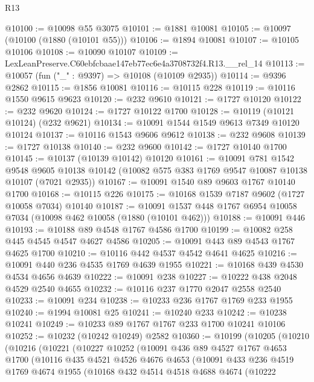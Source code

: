 \begin{lexlean}{R13}
\begin{coremodule}
@10100 := @10098 @55 @3075
@10101 := @1881 @10081
@10105 := @10097 (@10100 (@1880 (@10101 @55)))
@10106 := @1894 @10081
@10107 := @10105 @10106
@10108 := @10090 @10107
@10109 := LexLeanPreserve.C60ebfcbaae147eb77ec6e4a3708732f4.R13.__rel_14
@10113 := @10057 (fun ("_" : @9397) => @10108 (@10109 @2935))
@10114 := @9396 @2862
@10115 := @1856 @10081
@10116 := @10115 @228
@10119 := @10116 @1550 @9615 @9623
@10120 := @232 @9610
@10121 := @1727 @10120
@10122 := @232 @9620
@10124 := @1727 @10122 @1700
@10128 := @10119 (@10121 @10124) (@232 @9621)
@10134 := @10091 @1544 @1549 @9613 @7349 @10120 @10124
@10137 := @10116 @1543 @9606 @9612
@10138 := @232 @9608
@10139 := @1727 @10138
@10140 := @232 @9600
@10142 := @1727 @10140 @1700
@10145 := @10137 (@10139 @10142) @10120
@10161 := @10091
    @781
    @1542
    @9548
    @9605
    @10138
    @10142
    (@10082 @575 @383 @1769 @9547 @10087 @10138 @10107 (@7021 @2935))
@10167 := @10091 @1540 @89 @9603 @1767 @10140 @1700
@10168 := @10115 @226
@10175 := @10168 @1539 @7187 @9602 (@1727 @10058 @7034) @10140
@10187 := @10091 @1537 @448 @1767 @6954 @10058 @7034 (@10098 @462 @10058 (@1880 (@10101 @462)))
@10188 := @10091 @446
@10193 := @10188 @89 @4548 @1767 @4586 @1700
@10199 := @10082 @258 @445 @4545 @4547 @4627 @4586
@10205 := @10091 @443 @89 @4543 @1767 @4625 @1700
@10210 := @10116 @442 @4537 @4542 @4641 @4625
@10216 := @10091 @440 @236 @4535 @1769 @4639 @1955
@10221 := @10168 @439 @4530 @4534 @4656 @4639
@10222 := @10091 @238
@10227 := @10222 @438 @2048 @4529 @2540 @4655
@10232 := @10116 @237 @1770 @2047 @2558 @2540
@10233 := @10091 @234
@10238 := @10233 @236 @1767 @1769 @233 @1955
@10240 := @1994 @10081 @25
@10241 := @10240 @233
@10242 := @10238 @10241
@10249 := @10233 @89 @1767 @1767 @233 @1700 @10241 @10106
@10252 := @10232 (@10242 @10249) @2582
@10360 := @10199
    (@10205
      (@10210
        (@10216
          (@10221
            (@10227
              @10252
              (@10091
                @436
                @89
                @4527
                @1767
                @4653
                @1700
                (@10116
                  @435
                  @4521
                  @4526
                  @4676
                  @4653
                  (@10091
                    @433
                    @236
                    @4519
                    @1769
                    @4674
                    @1955
                    (@10168
                      @432
                      @4514
                      @4518
                      @4688
                      @4674
                      (@10222

\end{coremodule}
\end{lexlean}
